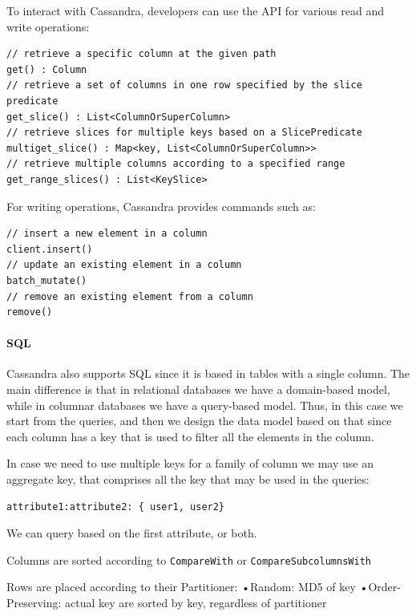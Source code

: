 To interact with Cassandra, developers can use the API for various read and write operations:
\begin{lstlisting}[style=Java]
// retrieve a specific column at the given path
get() : Column
// retrieve a set of columns in one row specified by the slice predicate
get_slice() : List<ColumnOrSuperColumn>
// retrieve slices for multiple keys based on a SlicePredicate
multiget_slice() : Map<key, List<ColumnOrSuperColumn>>
// retrieve multiple columns according to a specified range
get_range_slices() : List<KeySlice>
\end{lstlisting}
For writing operations, Cassandra provides commands such as:
\begin{lstlisting}[style=Java]
// insert a new element in a column
client.insert()
// update an existing element in a column
batch_mutate()
// remove an existing element from a column
remove()
\end{lstlisting}

\paragraph*{SQL}
Cassandra also supports SQL since it is based in tables with a single column.
The main difference is that in relational databases we have a domain-based model, while in columnar databases we have a query-based model. 
Thus, in this case we start from the queries, and then we design the data model based on that since each column has a key that is used to filter all the elements in the column. 

In case we need to use multiple keys for a family of column we may use an aggregate key, that comprises all the key that may be used in the queries: 
\begin{lstlisting}[style=C]
attribute1:attribute2: { user1, user2}
\end{lstlisting}
We can query based on the first attribute, or both. 

Columns
are sorted according to
\texttt{CompareWith} or \texttt{CompareSubcolumnsWith}

Rows
are placed according to their Partitioner:
•Random: MD5 of key
•Order-Preserving: actual key
are sorted by key, regardless of partitioner